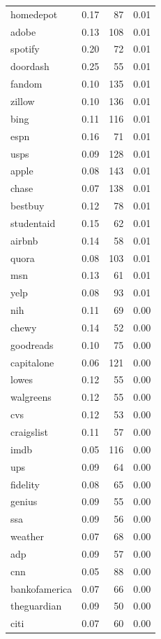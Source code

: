 \begin{table}[ht]
\begin{tabular}{lrrr}
  homedepot & 0.17 &  87 & 0.01 \\ 
  adobe & 0.13 & 108 & 0.01 \\ 
  spotify & 0.20 &  72 & 0.01 \\ 
  doordash & 0.25 &  55 & 0.01 \\ 
  fandom & 0.10 & 135 & 0.01 \\ 
  zillow & 0.10 & 136 & 0.01 \\ 
  bing & 0.11 & 116 & 0.01 \\ 
  espn & 0.16 &  71 & 0.01 \\ 
  usps & 0.09 & 128 & 0.01 \\ 
  apple & 0.08 & 143 & 0.01 \\ 
  chase & 0.07 & 138 & 0.01 \\ 
  bestbuy & 0.12 &  78 & 0.01 \\ 
  studentaid & 0.15 &  62 & 0.01 \\ 
  airbnb & 0.14 &  58 & 0.01 \\ 
  quora & 0.08 & 103 & 0.01 \\ 
  msn & 0.13 &  61 & 0.01 \\ 
  yelp & 0.08 &  93 & 0.01 \\ 
  nih & 0.11 &  69 & 0.00 \\ 
  chewy & 0.14 &  52 & 0.00 \\ 
  goodreads & 0.10 &  75 & 0.00 \\ 
  capitalone & 0.06 & 121 & 0.00 \\ 
  lowes & 0.12 &  55 & 0.00 \\ 
  walgreens & 0.12 &  55 & 0.00 \\ 
  cvs & 0.12 &  53 & 0.00 \\ 
  craigslist & 0.11 &  57 & 0.00 \\ 
  imdb & 0.05 & 116 & 0.00 \\ 
  ups & 0.09 &  64 & 0.00 \\ 
  fidelity & 0.08 &  65 & 0.00 \\ 
  genius & 0.09 &  55 & 0.00 \\ 
  ssa & 0.09 &  56 & 0.00 \\ 
  weather & 0.07 &  68 & 0.00 \\ 
  adp & 0.09 &  57 & 0.00 \\ 
  cnn & 0.05 &  88 & 0.00 \\ 
  bankofamerica & 0.07 &  66 & 0.00 \\ 
  theguardian & 0.09 &  50 & 0.00 \\ 
  citi & 0.07 &  60 & 0.00 \\ 

\end{tabular}
\end{table}
